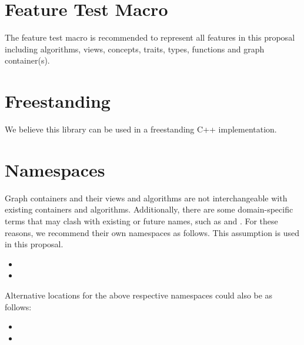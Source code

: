 \section{Feature Test Macro}
The  feature test macro is recommended to represent all features in this proposal including algorithms, views, concepts, traits, types, functions and graph container(s).

\section{Freestanding}
We believe this library can be used in a freestanding C++ implementation.

\section{Namespaces}
Graph containers and their views and algorithms are not interchangeable with existing containers and algorithms.
Additionally, there are some domain-specific terms that may clash with existing or future names, such as 
 and .
For these reasons, we recommend their own namespaces as follows. This assumption is used in this proposal.
\begin{itemize}
\item[]
\item[]
\end{itemize}

\noindent
Alternative locations for the above respective namespaces could also be as follows:
\begin{itemize}
\item[]
\item[]
\end{itemize}
